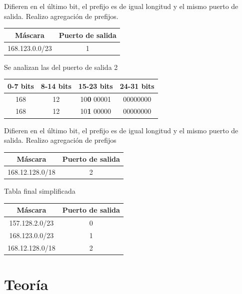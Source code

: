 \documentclass[titlepage,a4paper]{article}
\begin{document}
Difieren en el último bit, el prefijo es de igual longitud y el mismo puerto de salida. Realizo agregación de prefijos.


\begin{center}
    \begin{tabular}{c|c}
        Máscara & Puerto de salida \\
        \hline
        \hline
        168.123.0.0/23 &  1 \\
    \end{tabular}
\end{center}

Se analizan las del puerto de salida 2

\begin{center}
    \begin{tabular}{c|c|c|c}
        0-7 bits & 8-14 bits & 15-23 bits & 24-31 bits \\
        \hline
        \hline
        168 & 12 & 10\textbf{0} 00001 & 00000000 \\
        \hline
        168 & 12 & 10\textbf{1} 00000 & 00000000 \\
    \end{tabular}
\end{center}

Difieren en el último bit, el prefijo es de igual longitud y el mismo puerto de salida. Realizo agregación de prefijos 

\begin{center}
    \begin{tabular}{c|c}
        Máscara & Puerto de salida \\
        \hline
        \hline
        168.12.128.0/18 &  2 \\
    \end{tabular}
\end{center}

Tabla final simplificada

\begin{center}
    \begin{tabular}{c|c}
        Máscara & Puerto de salida \\
        \hline
        \hline
        157.128.2.0/23 &  0\\
        168.123.0.0/23 &  1 \\
        168.12.128.0/18 &  2 \\
    \end{tabular}
\end{center}

\section{Teoría}\label{sec:teoria}
\end{document}
